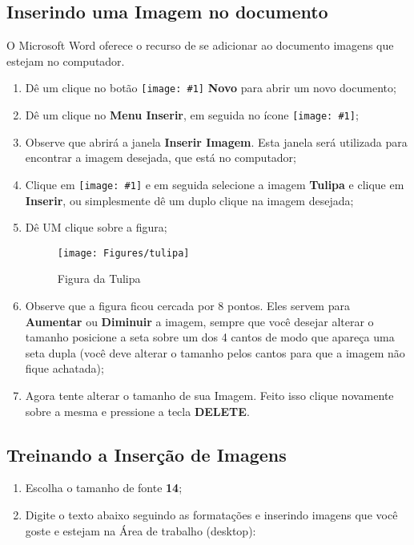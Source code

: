 \documentclass[hidelinks,12pt]{article}
\newcommand{\icon}[1]{\texttt{[image: \#1]}}
\begin{document}
\subsection{Inserindo uma Imagem no documento}

O Microsoft Word oferece o recurso de se adicionar ao documento imagens que estejam no computador.

\begin{enumerate}
	\item Dê um clique no botão \icon{Figures/novo} \textbf{Novo} para abrir um novo documento;

	\item Dê um clique no \textbf{Menu Inserir}, em seguida no ícone \icon{Figures/imagem};

	\item Observe que abrirá a janela \textbf{Inserir Imagem}. Esta janela será utilizada para encontrar a imagem desejada, que está no computador;

	\item Clique em \icon{Figures/desk} e em seguida selecione a imagem \textbf{Tulipa} e clique em \textbf{Inserir}, ou simplesmente dê um duplo clique na imagem desejada;

	\item Dê UM clique sobre a figura;
	
	\begin{figure}[!h]
		\centering
		\texttt{[image: Figures/tulipa]}
		\label{fig:tulipa}
		\caption{Figura da Tulipa}
	\end{figure}


	\item Observe que a figura ficou cercada por 8 pontos. Eles servem para \textbf{Aumentar} ou \textbf{Diminuir} a imagem, sempre que você desejar alterar o tamanho posicione a seta sobre um dos 4 cantos de modo que apareça uma seta dupla (você deve alterar o tamanho pelos cantos para que a imagem não fique achatada);

	\item Agora tente alterar o tamanho de sua Imagem. Feito isso clique novamente sobre a mesma e pressione a tecla \textbf{DELETE}.
\end{enumerate}

\subsection{Treinando a Inserção de Imagens}

\begin{enumerate}
	\item Escolha o tamanho de fonte \textbf{14};

	\item Digite o texto abaixo seguindo as formatações e inserindo imagens que você goste e estejam na Área de trabalho (desktop):
\end{enumerate}
		
\end{document}
